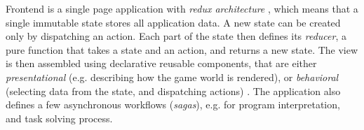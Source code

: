 Frontend is a single page application with \emph{redux architecture}
\cite[ch.\,12]{flux},
which means that a single immutable state stores all application data.
A new state can be created only by dispatching an action.
Each part of the state then defines its \emph{reducer},
a pure function that takes a state and an action, and returns a new state.
The view is then assembled using declarative reusable
components, that are
either \emph{presentational} (e.g. describing how the game world is
rendered), or \emph{behavioral} (selecting data from the state, %
and dispatching actions) \cite{react}. %
The application also defines a few asynchronous workflows (\emph{sagas}),
e.g. for program interpretation, and task solving process. %
%


